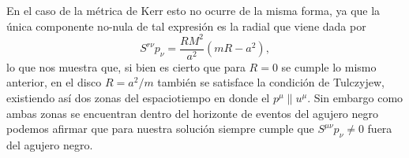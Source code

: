En el caso de la métrica de Kerr esto no ocurre de la misma forma, ya que la única componente no-nula de tal expresión es la radial que viene dada por
\begin{equation}
S^{r \nu} p_{\nu} = \frac{RM^2}{a^2} \left( mR-a^2 \right),
\end{equation}
lo que nos muestra que, si bien es cierto que para $R=0$ se cumple lo mismo anterior, en el disco $R=a^2/m$ también se satisface la condición de Tulczyjew, existiendo así dos zonas del espaciotiempo en donde el $p^{\mu} \parallel u^{\mu}$.  Sin embargo como ambas zonas se encuentran dentro del horizonte de eventos del agujero negro podemos afirmar que para nuestra solución siempre cumple que $S^{\mu \nu} p_{\nu} \neq 0$ fuera del agujero negro.